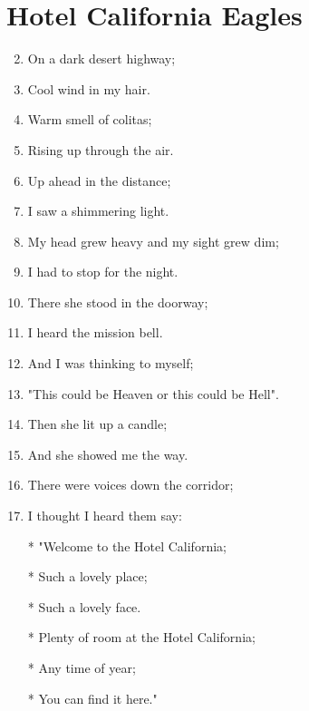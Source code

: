 \documentclass{article}
\begin{document}
    \section*{Hotel California \of Eagles}

    \begin{center}
        \begin{enumerate}

            \item[] 
            \item On a dark desert highway;
            \item Cool wind in my hair.
            \item Warm smell of colitas;
            \item Rising up through the air.
            \item Up ahead in the distance;
            \item I saw a shimmering light.
            \item My head grew heavy and my sight grew dim;
            \item I had to stop for the night.
            \item There she stood in the doorway;
            \item I heard the mission bell.
            \item And I was thinking to myself;
            \item "This could be Heaven or this could be Hell".
            \item Then she lit up a candle;
            \item And she showed me the way.
            \item There were voices down the corridor;
            \item I thought I heard them say:
        
            \item[]
            \item[] \chorus
            \item[*] "Welcome to the Hotel California;
            \item[*] Such a lovely place;
            \item[*] Such a lovely face.
            \item[*] Plenty of room at the Hotel California;
            \item[*] Any time of year;
            \item[*] You can find it here."


\end{enumerate}
\end{center}
\end{document}
